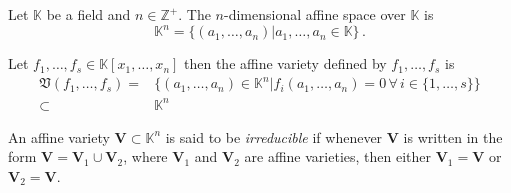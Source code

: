 \documentclass[main.tex]{subfiles}
\begin{document}
\begin{definition}
Let $\mathbb{K}$ be a field and $n\in\mathbb{Z}^+$. The $n$-dimensional affine space over $\mathbb{K}$ is
\begin{equation}
\mathbb{K}^n=\{(a_1,\dots,a_n)|a_1,\dots,a_n\in \mathbb{K}\}\,.
\end{equation}
\end{definition}
\begin{definition}
\label{def:affinevarities}
Let $f_1,\dots,f_s\in \mathbb{K}[x_1,\dots,x_n]$ then the affine variety defined by $f_1,\dots,f_s$ is 
\begin{equation}
\begin{aligned}
\mathfrak{V}(f_1,\dots,f_s)=&\{(a_1,\dots,a_n)\in \mathbb{K}^n|f_i(a_1,\dots,a_n)=0\,\forall \,i\in\{1,\dots,s\}\}\\
\subset &\mathbb{K}^n
\end{aligned}
\end{equation}
\end{definition}
\begin{definition}
An affine variety $\mathbf{V} \subset \mathbb{K}^{n}$ is said to be \textit{irreducible} if whenever $\mathbf{V}$ is written in the form $\mathbf{V} =\mathbf{V}_1 \cup \mathbf{V}_2$, where $\mathbf{V}_1$ and $\mathbf{V}_2$ are affine varieties, then either $\mathbf{V}_1=\mathbf{V}$ or $\mathbf{V}_2=\mathbf{V}$.
\end{definition}
\end{document}
